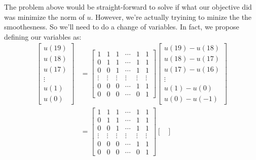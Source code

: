 \documentclass[12pt]{exam}
\begin{document}
\begin{questions}
\begin{solution}
\begin{enumerate}[label=(\alph*)]
      The problem above would be straight-forward to solve if what our objective did was minimize the norm of $u$. However, we're actually tryining to minize the the smoothesness. So we'll need to do a change of variables. In fact, we propose defining our variables as:
      \begin{align*}
        \begin{bmatrix}
            u(19) \\
            u(18) \\
            u(17) \\
            \vdots \\
            u(1)\\
            u(0)
          \end{bmatrix} &= 
          \begin{bmatrix}
            1 & 1 & 1 & \cdots & 1 & 1 \\
            0 & 1 & 1 & \cdots & 1 & 1 \\
            0 & 0 & 1 & \cdots & 1 & 1 \\
            \vdots & \vdots & \vdots & \vdots & \vdots & \vdots \\
            0 & 0 & 0 & \cdots & 1 & 1 \\
            0 & 0 & 0 & \cdots & 0 & 1
          \end{bmatrix}
          \begin{bmatrix}
            u(19) - u(18) \\
            u(18) - u(17) \\
            u(17) - u(16) \\
            \vdots \\
            u(1) - u(0) \\
            u(0) - u(-1)
          \end{bmatrix} \\
          &= 
          \begin{bmatrix}
            1 & 1 & 1 & \cdots & 1 & 1 \\
            0 & 1 & 1 & \cdots & 1 & 1 \\
            0 & 0 & 1 & \cdots & 1 & 1 \\
            \vdots & \vdots & \vdots & \vdots & \vdots & \vdots \\
            0 & 0 & 0 & \cdots & 1 & 1 \\
            0 & 0 & 0 & \cdots & 0 & 1
          \end{bmatrix}
          \begin{bmatrix}

\end{bmatrix}
\end{align*}
\end{enumerate}
\end{solution}
\end{questions}
\end{document}
